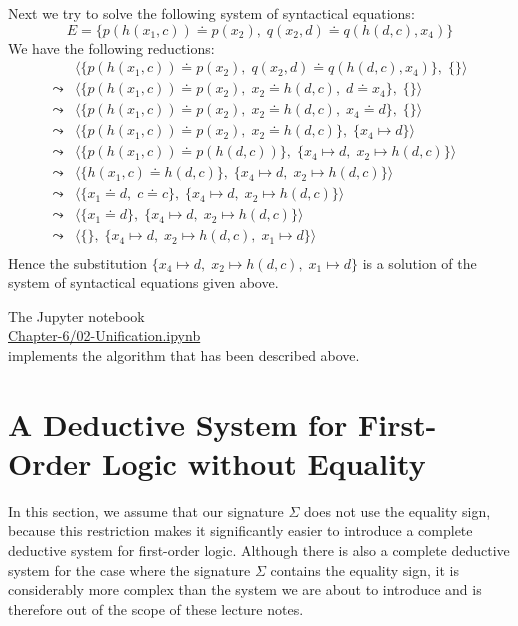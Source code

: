 \exampleEng
Next we try to solve the following system of syntactical equations: 
\[ E = \big\{ p(h(x_1,c)) \doteq p(x_2),\; q(x_2, d) \doteq q(h(d,c),x_4) \big\} \]
We have the following reductions:
$$
\begin{array}{ll}
          & \big\langle \big\{ p(h(x_1,c)) \doteq p(x_2),\; q(x_2, d) \doteq q(h(d,c),x_4) \big\},\; \{ \} \big\rangle \\[0.2cm]
 \leadsto & \big\langle \big\{ p(h(x_1,c)) \doteq p(x_2),\; x_2 \doteq h(d,c), \; d \doteq x_4 \big\},\; \{ \} \big\rangle \\[0.2cm]
 \leadsto & \big\langle \big\{ p(h(x_1,c)) \doteq p(x_2),\; x_2 \doteq h(d,c), \; x_4 \doteq d \big\},\; \{ \} \big\rangle \\[0.2cm]
 \leadsto & \big\langle \big\{ p(h(x_1,c)) \doteq p(x_2),\; x_2 \doteq h(d,c) \big\},\; \{ x_4 \mapsto d \} \big\rangle \\[0.2cm]
 \leadsto & \big\langle \big\{ p(h(x_1,c)) \doteq p(h(d,c)) \big\},\; \{ x_4 \mapsto d,\; x_2 \mapsto h(d,c) \} \big\rangle \\[0.2cm]
 \leadsto & \big\langle \big\{ h(x_1,c) \doteq h(d,c) \big\},\; \{ x_4 \mapsto d,\; x_2 \mapsto h(d,c) \} \big\rangle \\[0.2cm]
 \leadsto & \big\langle \big\{ x_1 \doteq d,\; c \doteq c \big\},\; \{ x_4 \mapsto d,\; x_2 \mapsto h(d,c) \} \big\rangle \\[0.2cm]
 \leadsto & \big\langle \big\{ x_1 \doteq d\big\},\; \{ x_4 \mapsto d,\; x_2 \mapsto h(d,c) \} \big\rangle \\[0.2cm]
 \leadsto & \big\langle \big\{\big\},\; \{ x_4 \mapsto d,\; x_2 \mapsto h(d,c),\; x_1 \mapsto d \} \big\rangle \\[0.2cm]
\end{array}
$$
Hence the  substitution  $\{ x_4 \mapsto d,\; x_2 \mapsto h(d,c),\; x_1 \mapsto d \}$ is a solution
of the system of syntactical equations given above.
\eox

The Jupyter notebook
\\[0.2cm]
\hspace*{1.3cm}
\href{https://github.com/karlstroetmann/Logic/blob/master/Java/Chapter-6/02-Unification.ipynb}{Chapter-6/02-Unification.ipynb}
\\[0.2cm]
implements the algorithm that has been described above.

\section{A Deductive System for First-Order Logic without Equality \label{sec:fol-calculus}}
In this section, we assume that our signature $\Sigma$ does not use the equality sign, because this restriction
makes it significantly easier to introduce a complete deductive system for first-order logic. Although there is
also a complete deductive system for the case where the signature $\Sigma$ contains the equality sign, it is
considerably more complex than the system we are about to introduce and is therefore out of the scope of these
lecture notes. 

